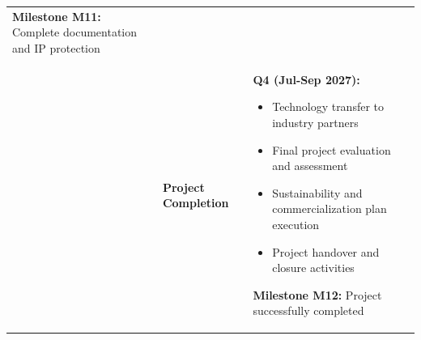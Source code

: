 \documentclass[12pt,a4paper]{article}
\begin{document}
\begin{longtable}{|p{2cm}|p{4cm}|p{8.5cm}|}
\textbf{Milestone M11:} Complete documentation and IP protection \\
\cline{2-3}

& \textbf{Project Completion} & 
\textbf{Q4 (Jul-Sep 2027):}
\begin{itemize}[leftmargin=1em, itemsep=0pt]
    \item Technology transfer to industry partners
    \item Final project evaluation and assessment
    \item Sustainability and commercialization plan execution
    \item Project handover and closure activities
\end{itemize}

\textbf{Milestone M12:} Project successfully completed \\
\hline

\end{longtable}

\newpage
\end{document}
